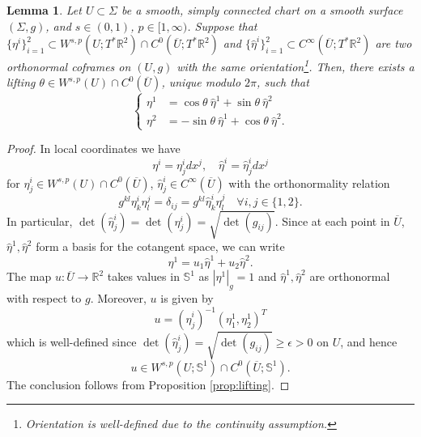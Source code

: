 \documentclass[12pt]{article}
\newcommand{\R}{\mathbb{R}}
\theoremstyle{plain}
\newtheorem{lemma}[theorem]{Lemma}
\numberwithin{equation}{section}
\begin{document}
\begin{lemma} \label{lemma:lifting_frame}
     Let $U \subset \Sigma$ be a smooth, simply connected chart on a smooth surface $(\Sigma, g)$, and $s \in (0,1)$, $p \in [1,\infty)$. Suppose that $\{\eta^i\}_{i=1}^2 \subset W^{s,p}(U; T^* \R^2) \cap C^0(\overline U; T^* \R^2)$ and $\{\hat\eta^i\}_{i=1}^2 \subset C^\infty(\overline U; T^*\R^2)$ are two orthonormal coframes on $(U,g)$ with the same orientation\footnote{Orientation is well-defined due to the continuity assumption.}. Then, there exists a lifting $\theta \in W^{s,p}(U) \cap C^0(\overline U)$, unique modulo $2\pi$, such that
     \begin{equation} \label{eq:lifting_rel}
        \begin{cases}
            \eta^1 &= \cos\theta ~\hat\eta^1 + \sin\theta~ \hat\eta^2\\
            \eta^2 &= -\sin\theta ~\hat\eta^1 + \cos\theta~ \hat\eta^2.
        \end{cases}
     \end{equation}
\end{lemma}
\begin{proof}
    In local coordinates we have
    \begin{equation*}
    \eta^i = \eta^i_j dx^j,\quad \hat\eta^i = \hat\eta^i_j dx^j
    \end{equation*}
    for $\eta^i_j \in W^{s,p}(U) \cap C^0(\overline U)$, $\hat\eta^i_j \in C^\infty(\overline U)$ with the orthonormality relation
    \begin{equation*}
        g^{kl} \eta^i_k \eta^j_l = \delta_{ij} = g^{kl} \hat\eta^i_k \hat\eta^j_l \quad \forall i, j \in \{1,2\}.
    \end{equation*}
    In particular, $\det(\hat{\eta}^i_j) = \det(\eta^i_j) = \sqrt{\det(g_{ij})}$. Since at each point in $\overline U$, $\hat\eta^1, \hat\eta^2$ form a basis for the cotangent space, we can write
    \begin{equation*}
        \eta^1 = u_1\hat\eta^1 + u_2\hat\eta^2.
    \end{equation*}
    The map $u : \overline U \to \R^2$ takes values in $\mathbb{S}^1$ as $|\eta^1|_g = 1$ and $\hat\eta^1,\hat\eta^2$ are orthonormal with respect to $g$. Moreover, $u$ is given by
    \begin{equation*}
        u = (\hat\eta^i_j)^{-1}(\eta^1_1,\eta^1_2)^T
    \end{equation*}
    which is well-defined since $\det(\hat\eta^i_j) = \sqrt{\det(g_{ij})} \geq \epsilon > 0$ on $U$, and hence
    \begin{equation*}
        u \in W^{s,p}(U;\mathbb{S}^1) \cap C^0(\overline U; \mathbb{S}^1).
    \end{equation*}
    The conclusion follows from Proposition \ref{prop:lifting}.
\end{proof}
\end{document}
